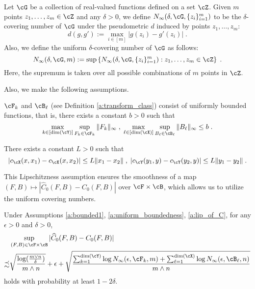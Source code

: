 \documentclass[11pt]{article}
\begin{document}
\begin{definition}
	Let $\cG$ be a collection of real-valued functions defined on a set $\cZ$. Given $m$ points $z_1, \ldots, z_m \in \cZ$ and any $\delta > 0$, we define $N_\infty(\delta, \cG, \{z_i\}_{i = 1}^{m})$ to be the $\delta$-covering number of $\cG$ under the pseudometric $d$ induced by points $z_1, \ldots, z_m$: 
	\begin{equation*}
		d(g, g') := \max_{i \in [m]} |g(z_i) - g'(z_i)| \;.
	\end{equation*}
	Also, we define the uniform $\delta$-covering number of $\cG$ as follows:
	\begin{equation*}
		N_\infty(\delta, \cG, m) := \sup\left\{N_\infty(\delta, \cG, \{z_i\}_{i = 1}^{m}) : z_1, \ldots, z_m \in \cZ\right\} \;.
	\end{equation*}
	Here, the supremum is taken over all possible combinations of $m$ points in $\cZ$.
\end{definition}

Also, we make the following assumptions.
\begin{assumption}
	\label{a:uniform_boundedness}
	$\cF_k$ and $\cB_\ell$ (see Definition \ref{a:transform_class}) consist of uniformly bounded functions, that is, there exists a constant $b > 0$ such that 
	\begin{equation*}
		\max_{k \in [\mathrm{dim}(\cY)]} \sup_{F_k \in \cF_k} \|F_k\|_\infty \;, \; \max_{\ell \in [\mathrm{dim}(\cX)]} \sup_{B_\ell \in \cB_\ell} \|B_\ell\|_\infty \le b \;.
	\end{equation*}
\end{assumption}

\begin{assumption}
	\label{a:lip_of_C}
	There exists a constant $L > 0$ such that 
	\begin{equation*}
		|c_{\cX}(x, x_1) - c_{\cX}(x, x_2)| \le L \|x_1 - x_2\| \;, \; |c_{\cY}(y_1, y) - c_{\cY}(y_2, y)| \le L \|y_1 - y_2\| \;.
	\end{equation*}
\end{assumption}
This Lipschitzness assumption ensures the smoothness of a map $(F, B) \mapsto |\widehat{C}_0(F, B) - C_0(F, B)|$ over $\cF \times \cB$, which allows us to utilize the uniform covering numbers.

\begin{proposition}
	\label{prop:union-bound-GW-term}
	Under Assumptions \ref{a:bounded1}, \ref{a:uniform_boundedness}, \ref{a:lip_of_C}, for any $\epsilon > 0$ and $\delta > 0$, 
	\begin{equation*}
		\begin{split}
			& \sup_{(F, B) \in \cF \times \cB} |\widehat{C}_0(F, B) - C_0(F, B)| \\
			\precsim
			& \sqrt{\frac{\log(\tfrac{m \vee n}{\delta})}{m \wedge n}} + \epsilon + \sqrt{\frac{\sum_{k = 1}^{\mathrm{dim}(\cY)} \log N_{\infty}(\epsilon, \cF_k, m) + \sum_{\ell = 1}^{\mathrm{dim}(\cX)} \log N_{\infty}(\epsilon, \cB_\ell, n)}{m \wedge n}}
		\end{split}
	\end{equation*}
	holds with probability at least $1 - 2 \delta$.
\end{proposition}
\end{document}
